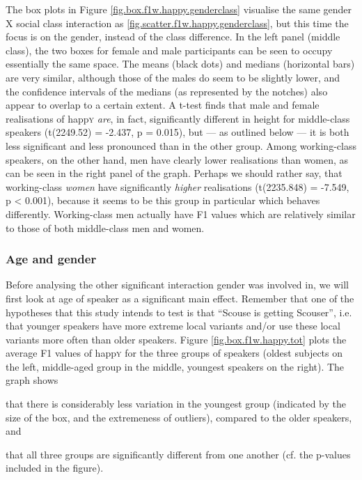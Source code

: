 The box plots in Figure \ref{fig.box.f1w.happy.genderclass} visualise the same gender X social class interaction as \ref{fig.scatter.f1w.happy.genderclass}, but this time the focus is on the gender, instead of the class difference.
In the left panel (middle class), the two boxes for female and male participants can be seen to occupy essentially the same space.
The means (black dots) and medians (horizontal bars) are very similar, although those of the males do seem to be slightly lower, and the confidence intervals of the medians (as represented by the notches) also appear to overlap to a certain extent.
A t-test finds that male and female realisations of happ\textsc{y} \emph{are}, in fact, significantly different in height for middle-class speakers (t(2249.52) = -2.437, p = 0.015), but --- as outlined below --- it is both less significant and less pronounced than in the other group.
Among working-class speakers, on the other hand, men have clearly lower realisations than women, as can be seen in the right panel of the graph.
Perhaps we should rather say, that working-class \emph{women} have significantly \emph{higher} realisations (t(2235.848) = -7.549, p < 0.001), because it seems to be this group in particular which behaves differently.
Working-class men actually have F1 values which are relatively similar to those of both middle-class men and women.

\subsubsection{Age and gender}
\label{sec.prod.res.vow.happy.f1.agegender}

Before analysing the other significant interaction gender was involved in, we will first look at age of speaker as a significant main effect.
Remember that one of the hypotheses that this study intends to test is that ``Scouse is getting Scouser'', i.e. that younger speakers have more extreme local variants and/or use these local variants more often than older speakers.
Figure \ref{fig.box.f1w.happy.tot} plots the average F1 values of happ\textsc{y} for the three groups of speakers (oldest subjects on the left, middle-aged group in the middle, youngest speakers on the right).
The graph shows
\begin{inparaenum}[(a)]
	\item that there is considerably less variation in the youngest group (indicated by the size of the box, and the extremeness of outliers), compared to the older speakers, and
	\item that all three groups are significantly different from one another (cf. the p-values included in the figure).
\end{inparaenum}

